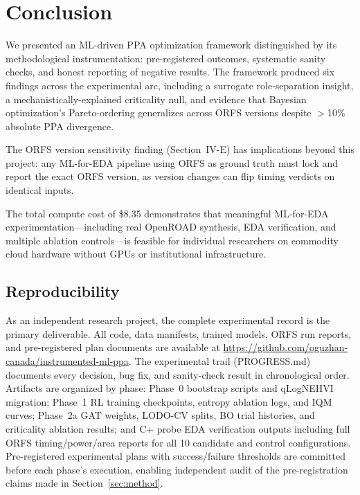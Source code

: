 \documentclass[conference]{IEEEtran}
\begin{document}
\section{Conclusion}

We presented an ML-driven PPA optimization framework distinguished by its
methodological instrumentation: pre-registered outcomes, systematic sanity
checks, and honest reporting of negative results. The framework produced six
findings across the experimental arc, including a surrogate role-separation
insight, a mechanistically-explained criticality null, and evidence that
Bayesian optimization's Pareto-ordering generalizes across ORFS versions
despite $>$10\% absolute PPA divergence.

The ORFS version sensitivity finding (Section~IV-E) has implications beyond
this project: any ML-for-EDA pipeline using ORFS as ground truth must lock
and report the exact ORFS version, as version changes can flip timing
verdicts on identical inputs.

The total compute cost of \$8.35 demonstrates that meaningful ML-for-EDA
experimentation—including real OpenROAD synthesis, EDA verification, and
multiple ablation controls—is feasible for individual researchers on
commodity cloud hardware without GPUs or institutional infrastructure.

\subsection*{Reproducibility}

As an independent research project, the complete experimental record is the
primary deliverable. All code, data manifests, trained models, ORFS run
reports, and pre-registered plan documents are available at
\url{https://github.com/oguzhan-canada/instrumented-ml-ppa}.
The experimental trail (PROGRESS.md) documents every decision, bug fix,
and sanity-check result in chronological order.
Artifacts are organized by phase: Phase~0 bootstrap scripts and qLogNEHVI
migration; Phase~1 RL training checkpoints, entropy ablation logs, and IQM
curves; Phase~2a GAT weights, LODO-CV splits, BO trial histories, and
criticality ablation results; and C+ probe EDA verification outputs
including full ORFS timing/power/area reports for all 10 candidate and
control configurations.
Pre-registered experimental plans with success/failure thresholds are
committed before each phase's execution, enabling independent audit of
the pre-registration claims made in Section~\ref{sec:method}.
\end{document}
